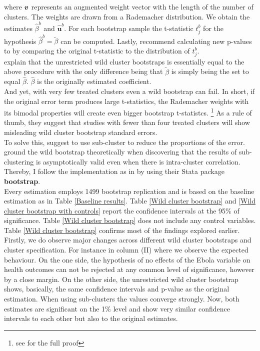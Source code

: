 \documentclass{article}
\begin{document}
where $\textbf{\textit{v}}$ represents an augmented weight vector with the length of the number of clusters. The weights are drawn from a Rademacher distribution. We obtain the estimates $\hat{\beta}^{b}$ and $\hat{\textbf{u}}^{b}$. For each bootstrap sample the t-statistic $t_j^{b} $ for the hypothesis $\hat{\beta}^{b} = \tilde{\beta}$ can be computed. Lastly, \cite{cameron2008bootstrap} recommend calculating new p-values to by comparing the original t-statistic to the distribution of $t_j^{b} $. \\
\cite{mackinnon2017wild} explain that the unrestricted wild cluster bootstraps is essentially equal to the above procedure with the only difference being that $\tilde{\beta}$ is simply being the set to equal $\hat{\beta}$. $\hat{\beta}$ is the originally estimated coefficient.\\
And yet, with very few treated clusters even a wild bootstrap can fail. In short, if the original error term produces large t-statistics, the Rademacher weights with its bimodal properties will create even bigger bootstrap t-statistcs. \footnote{see \cite{mackinnon2017wild} for the full proof} As a rule of thumb, they suggest that studies with fewer than four treated clusters will show misleading wild cluster bootstrap standard errors. \\
To solve this, \cite{mackinnon2018wild} suggest to use sub-cluster to reduce the proportions of the error. \cite{djogbenou2018asymptotic} ground the wild bootstrap theoretically when discovering that the results of sub-clustering is asymptotically valid even when there is intra-cluster correlation. Thereby, I follow the implementation as in \cite{roodman2019fast} by using their Stata package \textbf{bootstrap}.\\
Every estimation employs 1499 bootstrap replication and is based on the baseline estimation as in Table \ref{Baseline results}. Table \ref{Wild cluster bootstrap} and \ref{Wild cluster bootstrap with controls} report the confidence intervals at the 95\% of significance. Table \ref{Wild cluster bootstrap} does not include any control variables. \\
Table \ref{Wild cluster bootstrap} confirms most of the findings explored earlier. Firstly, we do observe major changes across different wild cluster bootstraps and cluster specification. For instance in column (II) where we observe the expected behaviour. On the one side, the hypothesis of no effects of the Ebola variable on health outcomes can not be rejected at any common level of significance, however by a close margin. On the other side, the unrestricted wild cluster bootstrap shows, basically, the same confidence intervals and p-value as the original estimation. When using sub-clusters the values converge strongly. Now, both estimates are significant on the 1\% level and show very similar confidence intervals to each other but also to the original estimates. \\
\end{document}
